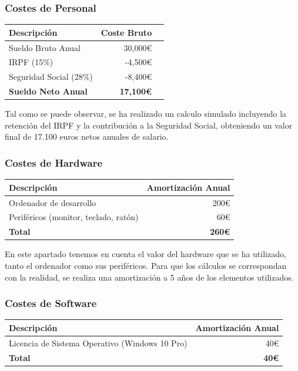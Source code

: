\subsubsection*{Costes de Personal}
\begin{tabular}{lrr}
\toprule
Descripción & Coste Bruto \\
\midrule
Sueldo Bruto Anual & 30,000€ \\
IRPF (15\%) & -4,500€ \\
Seguridad Social (28\%) & -8,400€ \\
\textbf{Sueldo Neto Anual} & \textbf{17,100€} \\
\bottomrule
\end{tabular}

Tal como se puede observar, se ha realizado un calculo simulado incluyendo la retención del IRPF y la contribución a la Seguridad Social, obteniendo un valor final de 17.100 euros netos anuales de salario.

\subsubsection*{Costes de Hardware}

\begin{tabular}{lr}
\toprule
Descripción & Amortización Anual \\
\midrule
Ordenador de desarrollo & 200€ \\
Periféricos (monitor, teclado, ratón) & 60€ \\
\textbf{Total} & \textbf{260€} \\
\bottomrule
\end{tabular}

En este apartado tenemos en cuenta el valor del hardware que se ha utilizado, tanto el ordenador como sus periféricos. Para que los cálculos se correspondan con la realidad, se realiza una amortización a 5 años de los elementos utilizados.

\subsubsection*{Costes de Software}

\begin{tabular}{lr}
\toprule
Descripción & Amortización Anual \\
\midrule
Licencia de Sistema Operativo (Windows 10 Pro) & 40€ \\
\textbf{Total} & \textbf{40€} \\
\bottomrule
\end{tabular}

